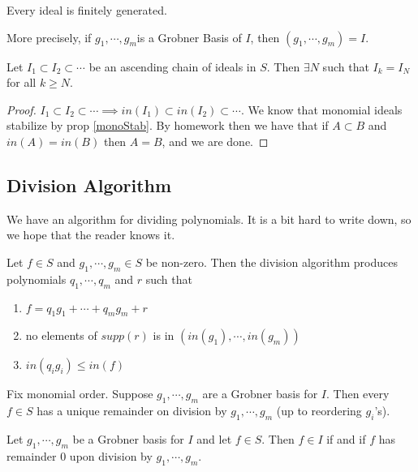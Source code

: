 \begin{theorem}
Every ideal is finitely generated.

More precisely, if $g_1, \cdots, g_m$is a Grobner Basis of $I$, then $(g_1, \cdots, g_m) = I$.
\end{theorem}

\begin{corollary}
Let $I_1 \subset I_2 \subset \cdots$ be an ascending chain of ideals in $S$. Then $\exists N$ such that $I_k = I_N$ for all $k \geq N$.
\end{corollary}

\begin{proof}
$I_1 \subset I_2 \subset \cdots \implies in(I_1) \subset in(I_2) \subset \cdots$. We know that monomial ideals stabilize by prop \ref{monoStab}. By homework then we have that if $A \subset B$ and $in(A) = in(B)$ then $A=B$, and we are done.
\end{proof}

\subsection{Division Algorithm}

We have an algorithm for dividing polynomials. It is a bit hard to write down, so we hope that the reader knows it.

\begin{theorem}
Let $f \in S$ and $g_1, \cdots , g_m \in S$ be non-zero. Then the division algorithm produces polynomials $q_1, \cdots, q_m$ and $r$ such that
\begin{enumerate}
    \item $f = q_1 g_1 + \cdots + q_m g_m + r$
    \item no elements of $supp(r)$ is in $( in (g_1 ) , \cdots, in(g_m) )$
    \item $in ( q_i g_i) \leq in(f)$
\end{enumerate}
\end{theorem}

\begin{theorem}
Fix monomial order. Suppose $g_1, \cdots, g_m$ are a Grobner basis for $I$. Then every $f \in S$ has a unique remainder on division by $g_1 , \cdots, g_m$ (up to reordering $g_i$'s).
\end{theorem}

\begin{corollary}
Let $g_1 , \cdots , g_m $ be a Grobner basis for $I$ and let $f \in S$. Then $f \in I $ if and if $f$ has remainder $0$ upon division by $g_1, \cdots , g_m$.
\end{corollary}

